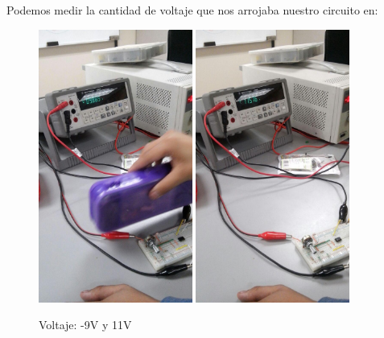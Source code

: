 \documentclass[12pt, fleqn]{article}                            %
\theoremstyle{break}                                            %
\begin{document}
            Podemos medir la cantidad de voltaje que nos arrojaba nuestro circuito 
            en:
            \begin{figure}[h]
                \centering
                \includegraphics[width=0.45\textwidth]{VoltajeFinalOcupado}
                \includegraphics[width=0.45\textwidth]{VoltajeFinalLibre}
                \caption{Voltaje: -9V y 11V}
            \end{figure}



    \clearpage
\end{document}
